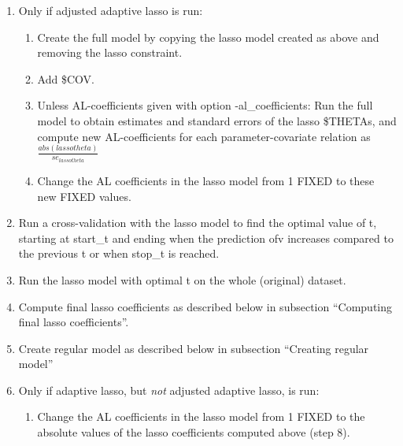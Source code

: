 \begin{enumerate}
\item Only if adjusted adaptive lasso is run: 
\begin{enumerate}
\item Create the full model by copying the lasso model created as above and removing the
lasso constraint. 
\item Add \$COV.
\item Unless AL-coefficients given with option -al\_coefficients:
Run the full model to obtain estimates and standard errors of the lasso \$THETAs,
and compute new AL-coefficients for each parameter-covariate relation 
as $\frac{abs(lasso theta)}{se_{lasso theta}}$
\item Change the AL coefficients in the lasso model from 1 FIXED to these new FIXED values.
\end{enumerate}
\item Run a cross-validation with the lasso model to find the optimal value of t, 
starting at start\_t and ending when the prediction ofv increases compared to the
previous t or when stop\_t is reached.
\item Run the lasso model with optimal t on the whole (original) dataset. 
\item Compute final lasso coefficients as described below in subsection
``Computing final lasso coefficients''.
\item Create regular model as described below in subsection ``Creating regular model''
\item Only if adaptive lasso, but \emph{not} adjusted adaptive lasso, is run:
\begin{enumerate}
\item Change the AL coefficients in the lasso model from 1 FIXED to the absolute values
of the lasso coefficients computed above (step 8).

\end{enumerate}
\end{enumerate}
